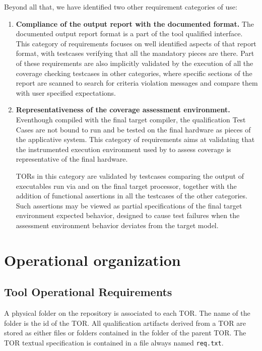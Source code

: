 \documentclass {report}
\begin{document}
Beyond all that, we have identified two other requirement categories of use:

\begin{enumerate}
\item \textbf{Compliance of the output report with the documented format.}
%
The documented output report format is a part of the tool qualified interface.
% 
This category of requirements focuses on well identified aspects of that
report format, with testcases verifying that all the mandatory pieces are
there.
%
Part of these requirements are also implicitly validated by the execution of
all the coverage checking testcases in other categories, where specific
sections of the report are scanned to search for criteria violation messages
and compare them with user specified expectations.

\item \textbf{Representativeness of the coverage assessment environment.}
%
Eventhough compiled with the final target compiler, the qualification Test
Cases are not bound to run and be tested on the final hardware as pieces of
the applicative system.
%
This category of requirements aims at validating that the instrumented
execution environment used by \xcov{} to assess coverage is representative of
the final hardware.

TORs in this category are validated by testcases comparing the output of
executables run via \xcov{} and on the final target processor, together with
the addition of functional assertions in all the testcases of the other
categories.
%
Such assertions may be viewed as partial specifications of the final target
environment expected behavior, designed to cause test failures when the
assessment environment behavior deviates from the target model.
\end{enumerate}

\section{Operational organization}

\subsection{Tool Operational Requirements}
A physical folder on the repository is associated to each TOR. The name of the folder is the id of the TOR. All qualification artifacts derived from a TOR are stored as either files or folders contained in the folder of the parent TOR. The TOR textual specification is contained in a file always named \texttt{req.txt}.
\end{document}
